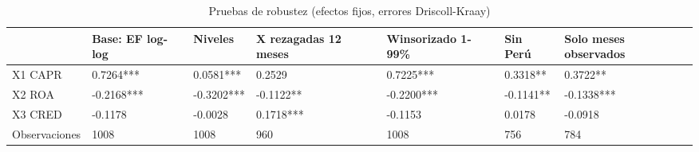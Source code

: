 \begin{table}[htbp]
\centering
\caption{Pruebas de robustez (efectos fijos, errores Driscoll-Kraay)}
\begin{tabular}{lllllll}
\hline
 & Base: EF log-log & Niveles & X rezagadas 12 meses & Winsorizado 1-99\% & Sin Perú & Solo meses observados \\
\hline
X1 CAPR & 0.7264*** & 0.0581*** & 0.2529 & 0.7225*** & 0.3318** & 0.3722** \\
X2 ROA & -0.2168*** & -0.3202*** & -0.1122** & -0.2200*** & -0.1141** & -0.1338*** \\
X3 CRED & -0.1178 & -0.0028 & 0.1718*** & -0.1153 & 0.0178 & -0.0918 \\
Observaciones & 1008 & 1008 & 960 & 1008 & 756 & 784 \\
\hline
\end{tabular}
\label{tab:tabla8_robustez}
\end{table}